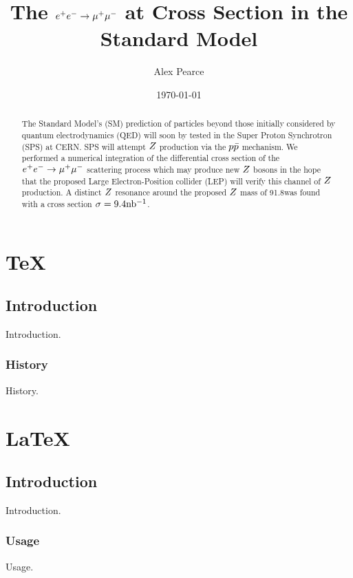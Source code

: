 \documentclass[]{report}
\begin{document}
\title{The $\ee \rarrow \mumu$ at Cross Section in the Standard Model}
\author{Alex Pearce}
\date{\today}
\maketitle

\begin{abstract}
	The Standard Model's (SM) prediction of particles beyond those initially considered by quantum electrodynamics (QED) will soon by tested in the Super Proton Synchrotron (SPS) at CERN. SPS will attempt $Z $ production via the $p\bar{p}$ mechanism. We performed a numerical integration of the differential cross section of the $\ee \rarrow \mumu$ scattering process which may produce new $Z $ bosons in the hope that the proposed Large Electron-Position collider (LEP) will verify this channel of $Z $ production. A distinct $Z $ resonance around the proposed $Z $ mass of 91.8\GeV was found with a cross section $\sigma=9.4\mbox{nb$^{-1}$} $.
\end{abstract}

\tableofcontents

\chapter{\TeX}

\section{Introduction}
Introduction.

\subsection{History}
History.

\chapter{\LaTeX}

\section{Introduction}
Introduction.

\subsection{Usage}
Usage.

\begin{thebibliography}{9}
\end{thebibliography}
\end{document}
